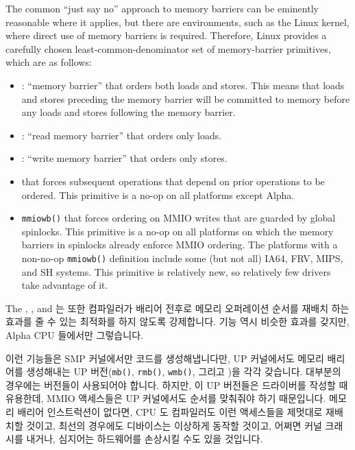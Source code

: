 The common ``just say no'' approach to memory barriers
can be eminently reasonable where it applies,
but there are environments, such as the Linux kernel, where direct
use of memory barriers is required.
Therefore,
Linux provides a carefully chosen least-common-denominator
set of memory-barrier primitives, which are as follows:
\begin{itemize}
\item	{}: ``memory barrier'' that orders both loads and
	stores.
	This means that loads and stores preceding the memory barrier
	will be committed to memory before any loads and stores
	following the memory barrier.
\item	{}: ``read memory barrier'' that orders only loads.
\item	{}: ``write memory barrier'' that orders only stores.
\item	{} that forces subsequent operations
	that depend on prior operations to be ordered.
	This primitive is a no-op on all platforms except Alpha.
\item	{\tt mmiowb()} that forces ordering on MMIO writes that are guarded
	by global spinlocks.
	This primitive is a no-op on all platforms on which the memory
	barriers in spinlocks already enforce MMIO ordering.
	The platforms with a non-no-op {\tt mmiowb()} definition include
	some (but not all) IA64, FRV, MIPS, and SH systems.
	This primitive is relatively new, so relatively few drivers take
	advantage of it.
\end{itemize}
\fi
The , , and  는 또한 컴파일러가
배리어 전후로 메모리 오퍼레이션 순서를 재배치 하는 효과를 줄 수 있는 최적화를
하지 않도록 강제합니다.
 기능 역시 비슷한 효과를 갖지만, Alpha CPU
들에서만 그렇습니다.

이런 기능들은 SMP 커널에서만 코드를 생성해냅니다만, UP 커널에서도 메모리
배리어를 생성해내는 UP 버전({\tt mb()}, {\tt rmb()}, {\tt wmb()}, 그리고
)을 각각 갖습니다.
대부분의 경우에는  버전들이 사용되어야 합니다.
하지만, 이 UP 버전들은 드라이버를 작성할 때 유용한데, MMIO 액세스들은 UP
커널에서도 순서를 맞춰줘야 하기 때문입니다.
메모리 배리어 인스트럭션이 없다면, CPU 도 컴파일러도 이런 액세스들을 제멋대로
재배치할 것이고, 최선의 경우에도 디바이스는 이상하게 동작할 것이고, 어쩌면 커널
크래시를 내거나, 심지어는 하드웨어를 손상시킬 수도 있을 것입니다.
\iffalse

